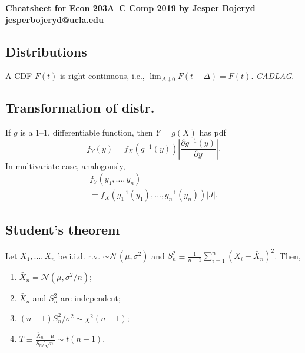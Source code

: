 \documentclass[9pt]{extarticle}
\newenvironment{noshow}{}{}
\begin{document}
 

\begin{noshow}
\begin{center}
    \large\textbf{Cheatsheet for Econ 203A--C Comp 2019 by Jesper Bojeryd -- jesperbojeryd@ucla.edu}
\end{center}
\end{noshow}

\begin{multicols*}{4}
\section*{Distributions}
\begin{noshow}
A CDF $F(t)$ is right continuous, i.e., $\lim_{\Delta \downarrow 0} F(t + \Delta) = F(t).$ \emph{CADLAG}.

\subsection*{Transformation of distr.} 
If $g$ is a 1--1, differentiable function, then $Y = g(X)$ has pdf
\begin{equation*}
    f_Y(y) = f_X(g^{-1}(y)) \left | \frac{\partial  g^{-1}(y)}{\partial y}\right |.
\end{equation*}
In multivariate case, analogously,
\begin{gather*}
    f_Y(y_1, \ldots{}, y_n) = \\ =
    f_X(g_1^{-1}(y_1), \ldots{}, g_n^{-1}(y_n))|J|.
\end{gather*}
\end{noshow}
\subsection*{Student's theorem}
Let $X_1, \ldots, X_n$ be i.i.d. r.v. $\sim \mathcal{N}(\mu, \sigma^2)$ and $S_n^2 \equiv \frac{1}{n-1}\sum_{i=1}^n (X_i - \bar{X}_n)^2$. Then,
\begin{enumerate}
    \item $\bar{X}_n = \mathcal{N}(\mu, \sigma^2/n)$;
    \item $\bar{X}_n$ and $S_n^2$ are independent;
    \item $(n-1)S_n^2/\sigma^2 \sim \chi^2(n-1)$;
    \item $\displaystyle T \equiv \frac{\bar{X}_n-\mu}{S_n/\sqrt{n}} \sim t(n-1)$.
\end{enumerate}


\end{multicols*}
\end{document}
